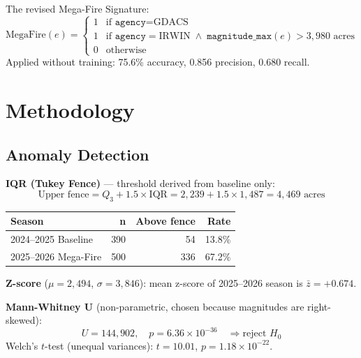 \documentclass[12pt, letterpaper]{article}
\begin{document}
\noindent The revised Mega-Fire Signature:
\begin{equation}
  \text{MegaFire}(e) =
  \begin{cases}
    1 & \text{if } \texttt{agency} = \text{GDACS} \\
    1 & \text{if } \texttt{agency} = \text{IRWIN}
            \;\wedge\; \texttt{magnitude\_max}(e) > 3{,}980 \text{ acres} \\
    0 & \text{otherwise}
  \end{cases}
\end{equation}
Applied without training: 75.6\% accuracy, 0.856 precision, 0.680 recall.

\section{Methodology}

\subsection{Anomaly Detection}

\textbf{IQR (Tukey Fence)} --- threshold derived from baseline only:
\begin{equation}
  \text{Upper fence} = Q_3 + 1.5 \times \mathrm{IQR}
  = 2{,}239 + 1.5 \times 1{,}487 = 4{,}469 \text{ acres}
\end{equation}

\begin{center}
\begin{tabular}{lrrr}
\toprule
Season & n & Above fence & Rate \\
\midrule
2024--2025 Baseline  & 390 & 54  & 13.8\% \\
2025--2026 Mega-Fire & 500 & 336 & 67.2\% \\
\bottomrule
\end{tabular}
\end{center}

\textbf{Z-score} ($\mu = 2{,}494$, $\sigma = 3{,}846$): mean z-score of
2025--2026 season is $\bar{z} = +0.674$.

\textbf{Mann-Whitney U} (non-parametric, chosen because magnitudes are
right-skewed):
\begin{equation}
  U = 144{,}902, \quad p = 6.36 \times 10^{-36}
  \quad \Rightarrow \text{reject } H_0
\end{equation}
Welch's $t$-test (unequal variances): $t = 10.01$,
$p = 1.18 \times 10^{-22}$.
\end{document}
